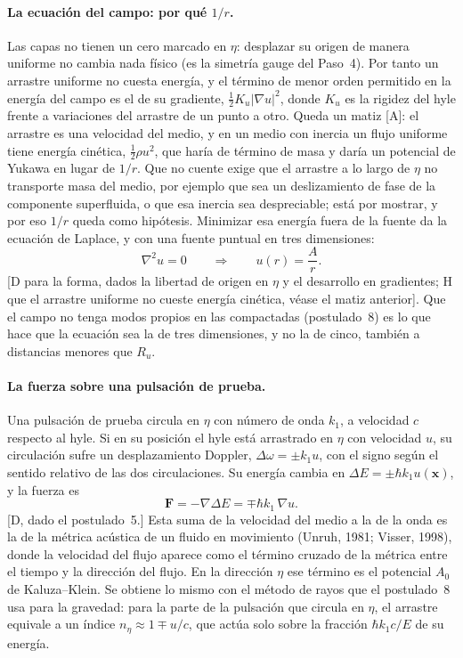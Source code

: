 \documentclass[11pt,a4paper]{article}
\newcommand{\st}[1]{\textup{[#1]}}
\newcommand{\vb}[1]{\symbf{#1}}
\newcommand{\apartado}[1]{\paragraph{#1}}
\begin{document}
\apartado{La ecuación del campo: por qué $1/r$.} Las capas no tienen un cero marcado en $\eta$: desplazar su origen de manera uniforme no cambia nada físico (es la simetría gauge del Paso~4). Por tanto un arrastre uniforme no cuesta energía, y el término de menor orden permitido en la energía del campo es el de su gradiente, $\tfrac12K_u|\nabla u|^2$, donde $K_u$ es la rigidez del hyle frente a variaciones del arrastre de un punto a otro. Queda un matiz \st{A}: el arrastre es una velocidad del medio, y en un medio con inercia un flujo uniforme tiene energía cinética, $\tfrac12\rho u^2$, que haría de término de masa y daría un potencial de Yukawa en lugar de $1/r$. Que no cuente exige que el arrastre a lo largo de $\eta$ no transporte masa del medio, por ejemplo que sea un deslizamiento de fase de la componente superfluida, o que esa inercia sea despreciable; está por mostrar, y por eso $1/r$ queda como hipótesis. Minimizar esa energía fuera de la fuente da la ecuación de Laplace, y con una fuente puntual en tres dimensiones:
\begin{equation}
\nabla^2u=0\qquad\Longrightarrow\qquad u(r)=\frac{A}{r} .
\label{eq:laplace_u}
\end{equation}
\st{D para la forma, dados la libertad de origen en $\eta$ y el desarrollo en gradientes; H que el arrastre uniforme no cueste energía cinética, véase el matiz anterior}. Que el campo no tenga modos propios en las compactadas (postulado~8) es lo que hace que la ecuación sea la de tres dimensiones, y no la de cinco, también a distancias menores que $R_u$.

\apartado{La fuerza sobre una pulsación de prueba.} Una pulsación de prueba circula en $\eta$ con número de onda $k_1$, a velocidad $c$ respecto al hyle. Si en su posición el hyle está arrastrado en $\eta$ con velocidad $u$, su circulación sufre un desplazamiento Doppler, $\Delta\omega=\pm k_1u$, con el signo según el sentido relativo de las dos circulaciones. Su energía cambia en $\Delta E=\pm\hbar k_1u(\vb{x})$, y la fuerza es
\begin{equation}
\vb{F}=-\nabla\Delta E=\mp\hbar k_1\,\nabla u .
\label{eq:fuerza_arrastre}
\end{equation}
\st{D, dado el postulado~5.} Esta suma de la velocidad del medio a la de la onda es la de la métrica acústica de un fluido en movimiento (Unruh, 1981; Visser, 1998), donde la velocidad del flujo aparece como el término cruzado de la métrica entre el tiempo y la dirección del flujo. En la dirección $\eta$ ese término es el potencial $A_0$ de Kaluza--Klein. Se obtiene lo mismo con el método de rayos que el postulado~8 usa para la gravedad: para la parte de la pulsación que circula en $\eta$, el arrastre equivale a un índice $n_\eta\approx1\mp u/c$, que actúa solo sobre la fracción $\hbar k_1c/E$ de su energía.
\end{document}
